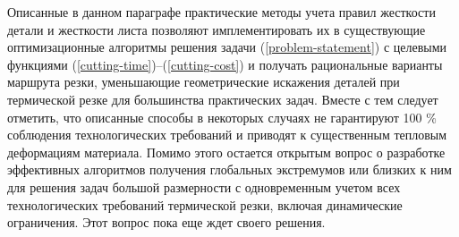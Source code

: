 Описанные в данном параграфе практические методы учета
правил жесткости детали и жесткости листа позволяют
имплементировать их в существующие оптимизационные
алгоритмы решения задачи (\ref{problem-statement})
с целевыми функциями (\ref{cutting-time})--(\ref{cutting-cost})
и получать рациональные варианты маршрута резки,
уменьшающие геометрические искажения деталей
при термической резке для большинства практических задач.
Вместе с тем следует отметить,
что описанные способы в некоторых случаях не гарантируют 100 \%
соблюдения технологических требований и
приводят к существенным тепловым деформациям материала.
Помимо этого остается открытым вопрос о разработке
эффективных алгоритмов получения глобальных экстремумов или
близких к ним для решения задач большой размерности с
одновременным учетом всех технологических требований
термической резки, включая динамические ограничения.
Этот вопрос пока еще ждет своего решения.
